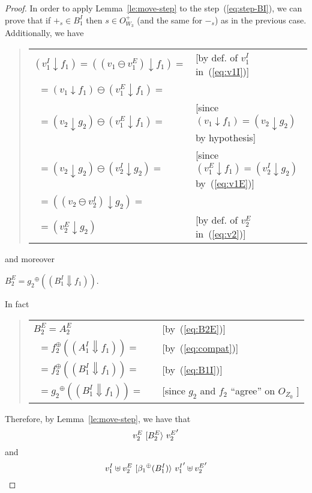 \documentclass{LMCS}
\newcommand{\mjoin}{\ensuremath{\uplus}}
\newcommand{\mon}[1]{\ensuremath{{#1}^\oplus}}
\newcommand{\monSub}[2]{\ensuremath{{#1}_{#2}^\oplus}}
\newcommand{\res}[2]{\ensuremath{({#1}\!\downarrow\!{#2})}}
\newcommand{\sres}[2]{\ensuremath{({#1}\!\Downarrow\!{#2})}}
\newcommand{\trans}[1]{\ensuremath{\ [\/{#1}\/\rangle}\ }
\begin{document}
\begin{proof}
  
  In order to apply Lemma~\ref{le:move-step} to the
  step~(\ref{eq:step-BI}), we can prove that if $+_s \in B_1^I$ then
  $s \in O_{W_3}^+$ (and the same for $-_s$) as in the previous case.
Additionally, we have
  \begin{quote}
    \begin{tabular}{ll}
      $\res{v_1^I}{f_1}  = \res{(v_1 \ominus v_1^E)}{f_1} =$ & 
      [by def. of $v_1^I$ in~(\ref{eq:v1I})]\\
\ \quad $= \res{v_1}{f_1} \ominus \res{v_1^E}{f_1} =$ & \\
\ \quad $= \res{v_2}{g_2} \ominus \res{v_1^E}{f_1} =$ &
      [since  $\res{v_1}{f_1} = \res{v_2}{g_2}$ by hypothesis]\\
\ \quad $= \res{v_2}{g_2} \ominus \res{v_2^I}{g_2} =$ &
      [since  $\res{v_1^E}{f_1} = \res{v_2^I}{g_2}$ by~(\ref{eq:v1E})]\\
\ \quad $= \res{(v_2 \ominus v_2^I)}{g_2} =$ &\\
\ \quad $= \res{v_2^E}{g_2}$ &
      [by def. of $v_2^E$ in~(\ref{eq:v2})]
    \end{tabular}
  \end{quote}
  and moreover
  \begin{center}
    $B_2^E  = \mon{g_2}(\sres{B_1^I}{f_1})$.
  \end{center}
  In fact
  \begin{quote}
    \begin{tabular}{lll}
      $B_2^E = A_2^E$ & & 
      [by~(\ref{eq:B2E})]\\
\ \quad $= \monSub{f}{2}(\sres{A_1^I}{f_1}) =$ & &
      [by~(\ref{eq:compat})]\\
\ \quad $= \monSub{f}{2}(\sres{B_1^I}{f_1}) =$ & &
      [by~(\ref{eq:B1I})]\\
\ \quad $= \mon{g_2}(\sres{B_1^I}{f_1}) =$ & &
      [since $g_2$ and $f_2$ ``agree'' on $O_{Z_0}$ ]\\
\end{tabular}
  \end{quote}
  
\noindent
  Therefore, by Lemma~\ref{le:move-step}, we have that 
  \begin{equation}
    v_2^E \trans{B_2^E} {v_2^E}'
  \end{equation}
  and
  \begin{equation}
    \label{eq:int2}
    v_1^I \mjoin v_2^E \trans{\mon{\beta_1}(B_1^I)} {v_1^I}' \mjoin {v_2^E}'
  \end{equation}
 

\end{proof}
\end{document}
